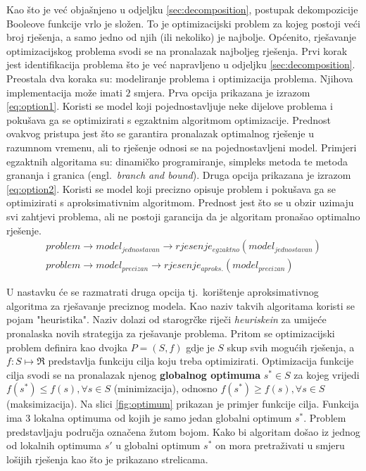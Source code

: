 \documentclass[times, utf8, diplomski]{fer}
\begin{document}
Kao što je već objašnjeno u odjeljku \ref{sec:decomposition}, postupak dekompozicije Booleove funkcije vrlo je složen. To je optimizacijski problem za kojeg postoji veći broj rješenja, a samo jedno od njih (ili nekoliko) je najbolje. Općenito, rješavanje optimizacijskog problema svodi se na pronalazak najboljeg rješenja. Prvi korak jest identifikacija problema što je već napravljeno u odjeljku \ref{sec:decomposition}. Preostala dva koraka su: modeliranje problema i optimizacija problema. Njihova implementacija može imati $2$ smjera. Prva opcija prikazana je izrazom \ref{eq:option1}. Koristi se model koji pojednostavljuje neke dijelove problema i pokušava ga se optimizirati s egzaktnim algoritmom optimizacije. Prednost ovakvog pristupa jest što se garantira pronalazak optimalnog rješenje u razumnom vremenu, ali to rješenje odnosi se na pojednostavljeni model. Primjeri egzaktnih algoritama su: dinamičko programiranje, simpleks metoda te metoda grananja i granica (engl.~\textit{branch and bound}). Druga opcija prikazana je izrazom \ref{eq:option2}. Koristi se model koji precizno opisuje problem i pokušava ga se optimizirati s aproksimativnim algoritmom. Prednost jest što se u obzir uzimaju svi zahtjevi problema, ali ne postoji garancija da je algoritam pronašao optimalno rješenje.
%
\begin{gather}
	\label{eq:option1}
	problem \rightarrow model_{jednostavan} \rightarrow rjesenje_{egzaktno}(model_{jednostavan}) \\
	\label{eq:option2}
	problem \rightarrow model_{precizan} \rightarrow rjesenje_{aproks.}(model_{precizan})
\end{gather}

U nastavku će se razmatrati druga opcija tj.~korištenje aproksimativnog algoritma za rješavanje preciznog modela. Kao naziv takvih algoritama koristi se pojam "heuristika". Naziv dolazi od starogrčke riječi \textit{heuriskein} za umijeće pronalaska novih strategija za rješavanje problema. Pritom se optimizacijski problem definira kao dvojka $P=(S,f)$ gdje je $S$ skup svih mogućih rješenja, a $f:S \mapsto \Re$ predstavlja funkciju cilja koju treba optimizirati. Optimizacija funkcije cilja svodi se na pronalazak njenog \textbf{globalnog optimuma} $s^{*} \in S$ za kojeg vrijedi $f(s^{*}) \leq f(s), \forall s \in S$ (minimizacija), odnosno $f(s^{*}) \geq f(s), \forall s \in S$ (maksimizacija). Na slici \ref{fig:optimum} prikazan je primjer funkcije cilja. Funkcija ima $3$ lokalna optimuma od kojih je samo jedan globalni optimum $s^{*}$. Problem predstavljaju područja označena žutom bojom. Kako bi algoritam došao iz jednog od lokalnih optimuma $s'$ u globalni optimum $s^{*}$ on mora pretraživati u smjeru lošijih rješenja kao što je prikazano strelicama.
\end{document}
